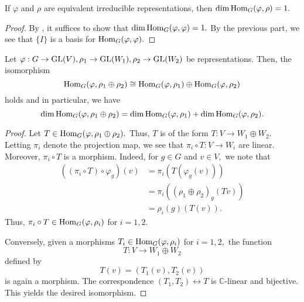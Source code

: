 \begin{cor} \label{cor:schurdimone}
	If $\varphi$ and $\rho$ are equivalent irreducible representations, then $\dim \operatorname{Hom}_{G}(\varphi, \rho) = 1.$
\end{cor}
\begin{proof} 
	By , it suffices to show that $\dim \operatorname{Hom}_{G}(\varphi, \varphi) = 1.$ By the previous part, we see that $\{I\}$ is a basis for $\operatorname{Hom}_{G}(\varphi, \varphi).$
\end{proof}

\begin{prop} \label{prop:homoplusiso}
	Let $\varphi : G \to \operatorname{GL}(V), \rho_1 \to \operatorname{GL}(W_1), \rho_2 \to \operatorname{GL}(W_2)$ be representations. Then, the isomorphism
	\begin{equation*} 
		\operatorname{Hom}_{G}(\varphi, \rho_1 \oplus \rho_2) \cong \operatorname{Hom}_{G}(\varphi, \rho_1) \oplus \operatorname{Hom}_{G}(\varphi, \rho_2)
	\end{equation*}
	holds and in particular, we have
	\begin{equation*} 
		\dim\operatorname{Hom}_{G}(\varphi, \rho_1 \oplus \rho_2) = \dim\operatorname{Hom}_{G}(\varphi, \rho_1) + \dim\operatorname{Hom}_{G}(\varphi, \rho_2).
	\end{equation*}
\end{prop}
\begin{proof} 
	Let $T \in \operatorname{Hom}_{G}(\varphi, \rho_1 \oplus \rho_2).$ Thus, $T$ is of the form $T : V \to W_1 \oplus W_2.$ Letting $\pi_i$ denote the projection map, we see that $\pi_i \circ T : V \to W_i$ are linear.\\
	Moreover, $\pi_i \circ T$ is a morphism. Indeed, for $g \in G$ and $v \in V,$ we note that
	\begin{align*} 
		((\pi_i \circ T)\circ\varphi_g)(v) &= \pi_i(T(\varphi_g(v)))\\
		&= \pi_i\left((\rho_1 \oplus \rho_2)_g(Tv)\right)\\
		&= \rho_i(g)(T(v)).
	\end{align*}
	Thus, $\pi_i \circ T \in \operatorname{Hom}_{G}(\varphi, \rho_i)$ for $i = 1, 2.$ 

	Conversely, given a morphisms $T_i \in \operatorname{Hom}_{G}(\varphi, \rho_i)$ for $i = 1, 2,$ the function
	\begin{equation*} 
		T : V \to W_1 \oplus W_2
	\end{equation*}
	defined by
	\begin{equation*} 
		T(v) = (T_1(v), T_2(v))
	\end{equation*}
	is again a morphism. The correspondence $(T_1, T_2) \leftrightarrow T$ is $\mathbb{C}$-linear and bijective. This yields the desired isomorphism.
\end{proof}

